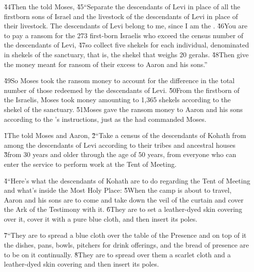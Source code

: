 \v{44}Then the  told Moses, \v{45}``Separate the descendants of Levi in place of all the firstborn sons of Israel and the livestock of the descendants of Levi in place of their livestock. The descendants of Levi belong to me, since I am the . \v{46}You are to pay a ransom for the 273 first-born Israelis who exceed the census number of the descendants of Levi, \v{47}so collect five shekels for each individual, denominated in shekels of the sanctuary, that is, the shekel that weighs 20 gerahs. \v{48}Then give the money meant for ransom of their excess to Aaron and his sons.''

\v{49}So Moses took the ransom money to account for the difference in the total number of those redeemed by the descendants of Levi. \v{50}From the firstborn of the Israelis, Moses took money amounting to 1,365 shekels according to the shekel of the sanctuary. \v{51}Moses gave the ransom money to Aaron and his sons according to the 's instructions, just as the  had commanded Moses.

\v{1}The  told Moses and Aaron, \v{2}``Take a census of the descendants of Kohath from among the descendants of Levi according to their tribes and ancestral houses \v{3}from 30 years and older through the age of 50 years, from everyone who can enter the service to perform work at the Tent of Meeting.

\v{4}``Here's what the descendants of Kohath are to do regarding the Tent of Meeting and what's inside the Most Holy Place: \v{5}When the camp is about to travel, Aaron and his sons are to come and take down the veil of the curtain and cover the Ark of the Testimony with it. \v{6}They are to set a leather-dyed skin covering over it, cover it with a pure blue cloth, and then insert its poles.

\v{7}``They are to spread a blue cloth over the table of the Presence and on top of it the dishes, pans, bowls, pitchers for drink offerings, and the bread of presence are to be on it continually. \v{8}They are to spread over them a scarlet cloth and a leather-dyed skin covering and then insert its poles.

